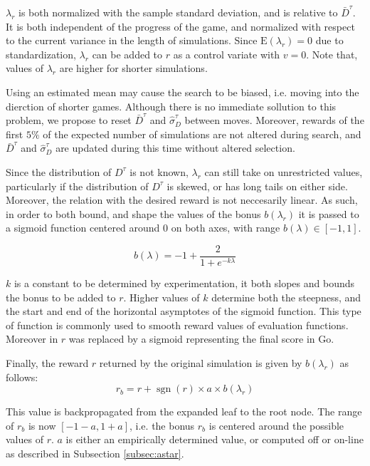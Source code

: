 \documentclass{ecai2014}
\newcommand{\sgn}{\mathop{\mathrm{sgn}}}
\newcommand{\E}[1]{\mathrm{E}\left( #1 \right)}
\begin{document}
$\lambda_r$ is both normalized with the sample standard deviation, and is relative to $\bar{D}^\tau$. It is both independent of the progress of the game, and normalized with respect to the current variance in the length of simulations. Since $\E{\lambda_r} = 0$ due to standardization, $\lambda_r$ can be added to $r$ as a control variate with $v = 0$. Note that, values of $\lambda_r$ are higher for shorter simulations.

Using an estimated mean may cause the search to be biased, i.e. moving into the dierction of shorter games. Although there is no immediate sollution to this problem, we propose to reset $\bar{D}^\tau$ and $\hat{\sigma}^\tau_D$ between moves. Moreover, rewards of the first $5\%$ of the expected number of simulations are not altered during search, and $\bar{D}^\tau$ and $\hat{\sigma}^\tau_D$ are updated during this time without altered selection.

Since the distribution of $D^\tau$ is not known, $\lambda_r$ can still take on unrestricted values, particularly if the distribution of $D^\tau$ is skewed, or has long tails on either side. Moreover, the relation with the desired reward is not neccesarily linear. As such, in order to both bound, and shape the values of the bonus $b(\lambda_r)$ it is passed to a sigmoid function centered around $0$ on both axes, with range $b(\lambda) \in [-1, 1]$. 

\begin{equation}
b(\lambda)=-1+\frac{2}{1+e^{-k\lambda}}
\label{eq:sigmoid}
\end{equation}

$k$ is a constant to be determined by experimentation, it both slopes and bounds the bonus to be added to $r$. Higher values of $k$ determine both the steepness, and the start and end of the horizontal asymptotes of the sigmoid function. This type of function is commonly used to smooth reward values of evaluation functions. Moreover in \cite{shibahara2008combining} $r$ was replaced by a sigmoid representing the final score in Go.

Finally, the reward $r$ returned by the original simulation is given by $b(\lambda_r)$ as follows:
\begin{equation}
r_b=r+\sgn(r)\times a \times b(\lambda_r)
\label{eq:rb}
\end{equation}

This value is backpropagated from the expanded leaf to the root node. The range of $r_b$ is now $[-1-a, 1+a]$, i.e. the bonus $r_b$ is centered around the possible values of $r$. $a$ is either an empirically determined value, or computed off or on-line as described in Subsection \ref{subsec:astar}.
\end{document}
